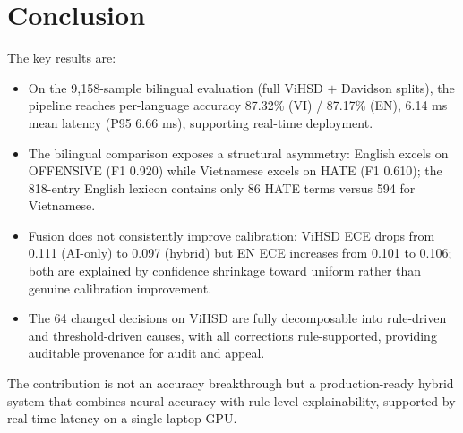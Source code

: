 \section{Conclusion}
\label{sec:conclusion}

The key results are:
\begin{itemize}
    \item On the 9{,}158-sample bilingual evaluation (full ViHSD $+$ Davidson splits), the
          pipeline reaches per-language accuracy 87.32\% (VI) / 87.17\% (EN),
          6.14 ms mean latency (P95 6.66 ms), supporting real-time deployment.
    \item The bilingual comparison exposes a structural asymmetry: English
          excels on OFFENSIVE (F1 0.920) while Vietnamese excels on HATE
          (F1 0.610); the 818-entry English lexicon contains only 86 HATE
          terms versus 594 for Vietnamese.
    \item Fusion does not consistently improve calibration: ViHSD ECE drops from 0.111 (AI-only) to 0.097 (hybrid) but EN ECE increases from 0.101 to 0.106; both are explained by confidence shrinkage toward uniform rather than genuine calibration improvement.
    \item The 64 changed decisions on ViHSD are fully decomposable into
          rule-driven and threshold-driven causes, with all corrections
          rule-supported, providing auditable provenance for audit and appeal.
\end{itemize}

The contribution is not an accuracy breakthrough but a production-ready
hybrid system that combines neural accuracy with rule-level explainability,
supported by real-time latency on a single laptop GPU.
